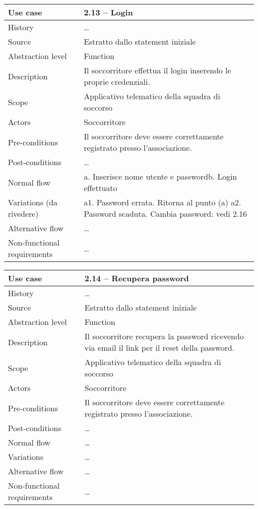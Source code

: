 \documentclass{article}
\begin{document}
    \begin{table}
        \begin{tabularx}{\textwidth}{l|X}
            Use case & 2.13 – Login\\
            \hline
            History & \dots \\
            Source & Estratto dallo statement iniziale\\
            Abstraction level & Function\\
            Description & Il soccorritore effettua il login inserendo le proprie credenziali.\\
            Scope & Applicativo telematico della squadra di soccorso\\
            Actors & Soccorritore\\
            Pre-conditions & Il soccorritore deve essere correttamente registrato presso l’associazione. \\
            Post-conditions & \dots \\
            Normal flow & a. Inserisce nome utente e password\newline b. Login effettuato \\
            Variations (da rivedere) & a1. Password errata. Ritorna al punto (a) \newline a2. Password scaduta. Cambia password: vedi 2.16 \\
            Alternative flow & \dots \\
            Non-functional requirements & \dots
        \end{tabularx}
        \label{tab:usecase2.13}
    \end{table}

    \begin{table}
        \begin{tabularx}{\textwidth}{l|X}
            Use case & 2.14 – Recupera password\\
            \hline
            History & \dots \\
            Source & Estratto dallo statement iniziale\\
            Abstraction level & Function\\
            Description & Il soccorritore recupera la password ricevendo via email il link per il reset della password.\\
            Scope & Applicativo telematico della squadra di soccorso\\
            Actors & Soccorritore\\
            Pre-conditions & Il soccorritore deve essere correttamente registrato presso l’associazione. \\
            Post-conditions & \dots \\
            Normal flow & \dots \\
            Variations & \dots \\
            Alternative flow & \dots \\
            Non-functional requirements & \dots
        \end{tabularx}
        \label{tab:usecase2.14}
    \end{table}
\end{document}

